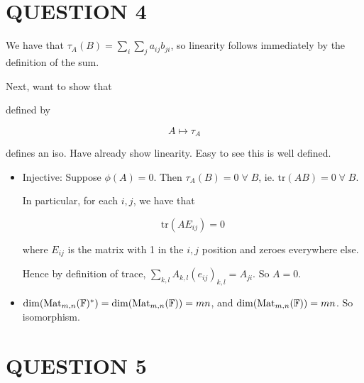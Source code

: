 \documentclass[a4paper]{article}
\begin{document}
\section{QUESTION 4}

We have that $ \tau_{A}(B) = \sum_{i} \sum_{j} a_{ij} b_{ji}    $, so linearity follows immediately by the definition of the sum. 

Next, want to show that 

	\begin{center}
\end{center}

defined by

\[ A \mapsto \tau_{A} \]

 defines an iso. Have already show linearity. Easy to see this is well defined. 
\begin{itemize}
	\item Injective: Suppose $ \phi(A) = 0 $. Then $ \tau_{A}(B) = 0 \; \forall \; B $, ie. $ \text{tr}(AB) = 0 \; \forall \; B $.
	
	In particular, for each $ i,j $, we have that
	
	\[ \text{tr}(AE_{ij}) = 0 \]
	
	where $ E_{ij} $ is the matrix with 1 in the $ i,j $ position and zeroes everywhere else. 
	
	Hence by definition of trace, $ \sum_{k,l} A_{k,l}(e_{ij})_{k,l} = A_{ji} $. So $ A = 0 $.
	
	\item  $ \dim(\mathrm{Mat}_{m,n}(\mathbb{F})^{*}) = \dim(\mathrm{Mat}_{m,n}(\mathbb{F})) = mn $, and $ \dim(\mathrm{Mat}_{m,n}(\mathbb{F})) = mn $. So isomorphism. 
	

	
\end{itemize}


\section{QUESTION 5}
\end{document}
